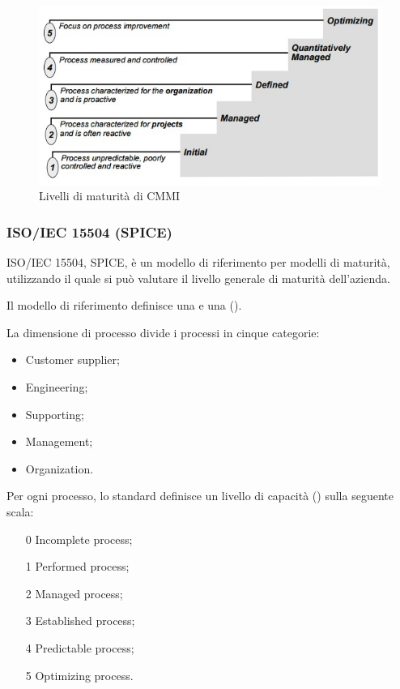 \begin{figure}[h!]
  \centering
  \includegraphics[scale=0.5]{imgs/cmmi_maturity_level}
  \caption{Livelli di maturità di CMMI}
\end{figure}

\subsubsection{ISO/IEC 15504 (SPICE)}
\label{ssub:spice}

ISO/IEC 15504,  SPICE, è un modello di riferimento per modelli di
maturità, utilizzando il quale si può valutare il livello generale di maturità
dell'azienda.

Il modello di riferimento definisce una  e una
 ().

La dimensione di processo divide i processi in cinque categorie:

\begin{itemize}
  \item Customer supplier;
  \item Engineering;
  \item Supporting;
  \item Management;
  \item Organization.
\end{itemize}

Per ogni processo, lo standard definisce un livello di capacità
() sulla seguente scala:

\begin{enumerate}
  \item[0] Incomplete process;
  \item[1] Performed process;
  \item[2] Managed process;
  \item[3] Established process;
  \item[4] Predictable process;
  \item[5] Optimizing process.
\end{enumerate}

